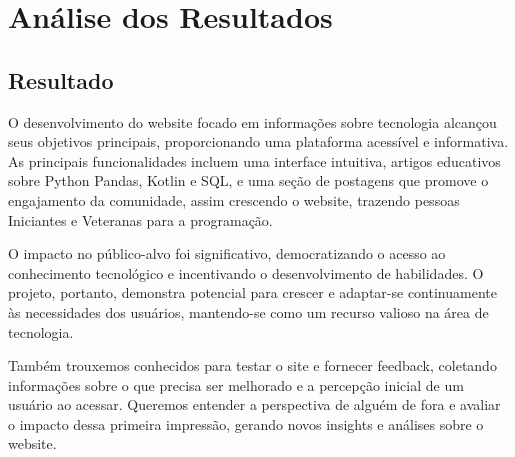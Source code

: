 \chapter{Análise dos Resultados}
\label{ch:resultados}


\section{Resultado}
    O desenvolvimento do website focado em informações sobre tecnologia alcançou seus objetivos principais, proporcionando uma plataforma acessível e informativa. As principais funcionalidades incluem uma interface intuitiva, artigos educativos sobre Python Pandas, Kotlin e SQL, e uma seção de postagens que promove o engajamento da comunidade, assim crescendo o website, trazendo pessoas Iniciantes e Veteranas para a programação.

    \vspace{50pt}
    
    O impacto no público-alvo foi significativo, democratizando o acesso ao conhecimento tecnológico e incentivando o desenvolvimento de habilidades. O projeto, portanto, demonstra potencial para crescer e adaptar-se continuamente às necessidades dos usuários, mantendo-se como um recurso valioso na área de tecnologia.

    \vspace{50pt}
    
    Também trouxemos conhecidos para testar o site e fornecer feedback, coletando informações sobre o que precisa ser melhorado e a percepção inicial de um usuário ao acessar. Queremos entender a perspectiva de alguém de fora e avaliar o impacto dessa primeira impressão, gerando novos insights e análises sobre o website.